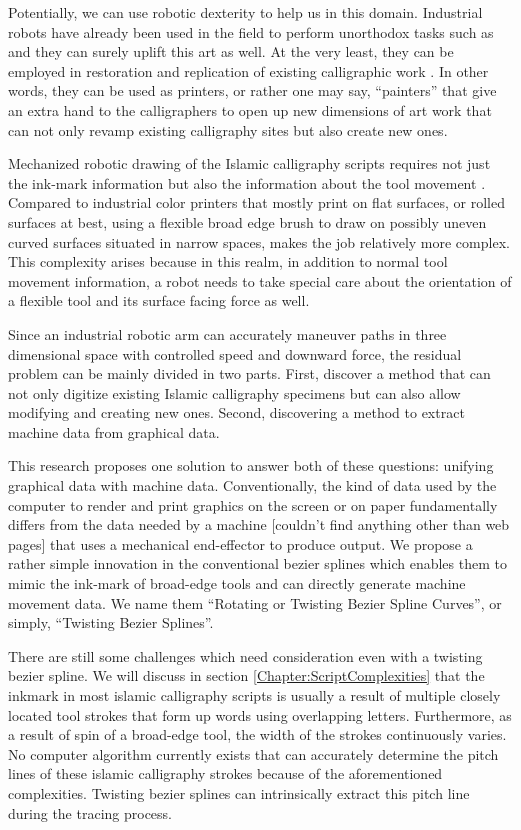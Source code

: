 {    Potentially, we can use robotic dexterity to help us in this domain. Industrial robots have already been used in the field to perform unorthodox tasks such as \cite{bib09, bib10,bib11,bib12} and they can surely uplift this art as well. At the very least, they can be employed in restoration and replication of existing calligraphic work \cite{bib13}. In other words, they can be used as printers, or rather one may say, ``painters'' that give an extra hand to the calligraphers to open up new dimensions of art work that can not only revamp existing calligraphy sites but also create new ones.

    Mechanized robotic drawing of the Islamic calligraphy scripts requires not just the ink-mark information but also the information about the tool movement \cite{bib03}. Compared to industrial color printers that mostly print on flat surfaces, or rolled surfaces at best, using a flexible broad edge brush to draw on possibly uneven curved surfaces situated in narrow spaces, makes the job relatively more complex. This complexity arises because in this realm, in addition to normal tool movement information, a robot needs to take special care about the orientation of a flexible tool and its surface facing force as well.

    Since an industrial robotic arm can accurately maneuver paths in three dimensional space with controlled speed and downward force, the residual problem can be mainly divided in two parts. First, discover a method that can not only digitize existing Islamic calligraphy specimens but can also allow modifying and creating new ones. Second, discovering a method to extract machine data from graphical data.

    This research proposes one solution to answer both of these questions: unifying graphical data with machine data. Conventionally, the kind of data used by the computer to render and print graphics on the screen or on paper fundamentally differs from the data needed by a machine [couldn't find anything other than web pages] \cite{bib24,bib25,bib26,bib27} that uses a mechanical end-effector to produce output. We propose a rather simple innovation in the conventional bezier splines which enables them to mimic the ink-mark of broad-edge tools and can directly generate machine movement data. We name them ``Rotating or Twisting Bezier Spline Curves'', or simply, ``Twisting Bezier Splines''.

    There are still some challenges which need consideration even with a twisting bezier spline. We will discuss in section \ref{Chapter:ScriptComplexities} that the inkmark in most islamic calligraphy scripts is usually a result of multiple closely located tool strokes that form up words using overlapping letters. Furthermore, as a result of spin of a broad-edge tool, the width of the strokes continuously varies. No computer algorithm currently exists that can accurately determine the pitch lines of these islamic calligraphy strokes because of the aforementioned complexities. Twisting bezier splines can intrinsically extract this pitch line during the tracing process.

}

